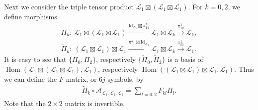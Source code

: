\documentclass[pdftex]{sigma}
\numberwithin{equation}{section}
\theoremstyle{definition}
\begin{document}
Next we consider the triple tensor product $\mathcal{L}_1\boxtimes(\mathcal{L}_1\boxtimes\mathcal{L}_1)$. For $k=0,2$, we define morphisms
\begin{gather*}
 \Pi_k\colon\ \mathcal{L}_1\boxtimes(\mathcal{L}_1\boxtimes\mathcal{L}_1)\xrightarrow{\mathrm{Id}_{\mathcal{L}_1}\boxtimes\pi_{11}^k} \mathcal{L}_1\boxtimes\mathcal{L}_k\xrightarrow{\pi_{1k}^1} \mathcal{L}_1,\\
 \widetilde{\Pi}_k\colon\ (\mathcal{L}_1\boxtimes\mathcal{L}_1)\boxtimes\mathcal{L}_1\xrightarrow{\pi_{11}^k\boxtimes\mathrm{Id}_{\mathcal{L}_1}} \mathcal{L}_1\boxtimes\mathcal{L}_k\xrightarrow{\pi_{k1}^1} \mathcal{L}_1.
\end{gather*}
It is easy to see that $\lbrace\Pi_0,\Pi_2\rbrace$, respectively $\lbrace\widetilde{\Pi}_0,\widetilde{\Pi}_2\rbrace$ is a basis of $\operatorname{Hom}(\mathcal{L}_1\boxtimes(\mathcal{L}_1\boxtimes\mathcal{L}_1),\mathcal{L}_1)$, respectively $\operatorname{Hom}((\mathcal{L}_1\boxtimes\mathcal{L}_1)\boxtimes\mathcal{L}_1,\mathcal{L}_1)$. Thus we can define the $F$-matrix, or $6j$-symbols, by
\begin{gather*}
\widetilde{\Pi}_k\circ\mathcal{A}_{\mathcal{L}_1,\mathcal{L}_1,\mathcal{L}_1} =\sum_{l=0,2} F_{kl}\Pi_l.
\end{gather*}
Note that the $2\times 2$ matrix  is invertible.
\end{document}
